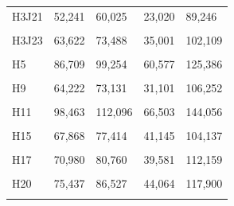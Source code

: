 \documentclass[
  a4paper,
  titlepage]{article}
\begin{document}
\begin{longtable}[t]{lllll}
H3J21 & 52,241 & 60,025 & 23,020 & 89,246\\
 
\cellcolor{gray!6}{H3J22} & \cellcolor{gray!6}{60,216} & \cellcolor{gray!6}{69,121} & \cellcolor{gray!6}{31,732} & \cellcolor{gray!6}{97,605}\\
 
H3J23 & 63,622 & 73,488 & 35,001 & 102,109\\
 
\cellcolor{gray!6}{H4} & \cellcolor{gray!6}{71,101} & \cellcolor{gray!6}{80,896} & \cellcolor{gray!6}{40,796} & \cellcolor{gray!6}{111,201}\\
 
H5 & 86,709 & 99,254 & 60,577 & 125,386\\
 
\cellcolor{gray!6}{H8} & \cellcolor{gray!6}{67,005} & \cellcolor{gray!6}{76,203} & \cellcolor{gray!6}{35,889} & \cellcolor{gray!6}{107,319}\\
 
H9 & 64,222 & 73,131 & 31,101 & 106,252\\
 
\cellcolor{gray!6}{H10} & \cellcolor{gray!6}{105,869} & \cellcolor{gray!6}{120,811} & \cellcolor{gray!6}{81,264} & \cellcolor{gray!6}{145,416}\\
 
H11 & 98,463 & 112,096 & 66,503 & 144,056\\
 
\cellcolor{gray!6}{H13} & \cellcolor{gray!6}{86,330} & \cellcolor{gray!6}{97,929} & \cellcolor{gray!6}{55,585} & \cellcolor{gray!6}{128,674}\\
 
H15 & 67,868 & 77,414 & 41,145 & 104,137\\
 
\cellcolor{gray!6}{H16} & \cellcolor{gray!6}{84,011} & \cellcolor{gray!6}{95,371} & \cellcolor{gray!6}{54,706} & \cellcolor{gray!6}{124,676}\\
 
H17 & 70,980 & 80,760 & 39,581 & 112,159\\
 
\cellcolor{gray!6}{H18} & \cellcolor{gray!6}{88,967} & \cellcolor{gray!6}{100,585} & \cellcolor{gray!6}{58,867} & \cellcolor{gray!6}{130,685}\\
 
H20 & 75,437 & 86,527 & 44,064 & 117,900\\
 
\cellcolor{gray!6}{H21} & \cellcolor{gray!6}{83,961} & \cellcolor{gray!6}{95,756} & \cellcolor{gray!6}{59,816} & \cellcolor{gray!6}{119,901}\\
 

\end{longtable}
\end{document}
